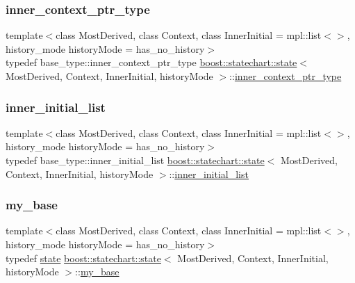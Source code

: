 \subsubsection{\texorpdfstring{inner\+\_\+context\+\_\+ptr\+\_\+type}{inner\_context\_ptr\_type}}
{\footnotesize\ttfamily template$<$class Most\+Derived, class Context, class Inner\+Initial = mpl\+::list$<$$>$, history\+\_\+mode history\+Mode = has\+\_\+no\+\_\+history$>$ \\
typedef base\+\_\+type\+::inner\+\_\+context\+\_\+ptr\+\_\+type \mbox{\hyperlink{classboost_1_1statechart_1_1state}{boost\+::statechart\+::state}}$<$ Most\+Derived, Context, Inner\+Initial, history\+Mode $>$\+::\mbox{\hyperlink{classboost_1_1statechart_1_1simple__state_ad6d3233a11a23e91b4cc9edcae799379}{inner\+\_\+context\+\_\+ptr\+\_\+type}}}

\mbox{\label{classboost_1_1statechart_1_1state_a92bffaa636b23b9a1176bf011e989794}} 
\subsubsection{\texorpdfstring{inner\+\_\+initial\+\_\+list}{inner\_initial\_list}}
{\footnotesize\ttfamily template$<$class Most\+Derived, class Context, class Inner\+Initial = mpl\+::list$<$$>$, history\+\_\+mode history\+Mode = has\+\_\+no\+\_\+history$>$ \\
typedef base\+\_\+type\+::inner\+\_\+initial\+\_\+list \mbox{\hyperlink{classboost_1_1statechart_1_1state}{boost\+::statechart\+::state}}$<$ Most\+Derived, Context, Inner\+Initial, history\+Mode $>$\+::\mbox{\hyperlink{classboost_1_1statechart_1_1simple__state_ae86cab19f07d10cd8e46937fd243d4ba}{inner\+\_\+initial\+\_\+list}}}

\mbox{\label{classboost_1_1statechart_1_1state_a6a9cebd0c102585d9deeb1f4f6c8106e}} 
\subsubsection{\texorpdfstring{my\+\_\+base}{my\_base}}
{\footnotesize\ttfamily template$<$class Most\+Derived, class Context, class Inner\+Initial = mpl\+::list$<$$>$, history\+\_\+mode history\+Mode = has\+\_\+no\+\_\+history$>$ \\
typedef \mbox{\hyperlink{classboost_1_1statechart_1_1state}{state}} \mbox{\hyperlink{classboost_1_1statechart_1_1state}{boost\+::statechart\+::state}}$<$ Most\+Derived, Context, Inner\+Initial, history\+Mode $>$\+::\mbox{\hyperlink{classboost_1_1statechart_1_1state_a6a9cebd0c102585d9deeb1f4f6c8106e}{my\+\_\+base}}\hspace{0.3cm}{\ttfamily [protected]}}

